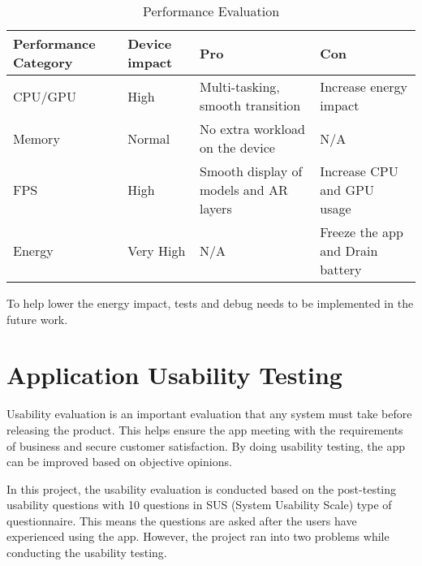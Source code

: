 \begin{table}[!h]
\centering
\begin{tabularx}{\textwidth} {
  | >{\raggedright\arraybackslash}X 
  | >{\raggedright\arraybackslash}X 
  | >{\raggedright\arraybackslash}X 
  | >{\raggedright\arraybackslash}X | }
\hline
Performance Category & Device impact & Pro & Con \\
\hline
\hline
CPU/GPU& High & Multi-tasking, smooth transition & Increase energy impact  \\
\hline
Memory & Normal & No extra workload on the device & N/A \\
\hline
FPS & High & Smooth display of models and AR layers & Increase CPU and GPU usage \\
\hline
Energy & Very High & N/A & Freeze the app and Drain battery \\
\hline
\end{tabularx}
\caption {Performance Evaluation}
\label{tab:perEvaluation}
\end{table}

To help lower the energy impact, tests and debug needs to be implemented in the future work. 

\section{Application Usability Testing}

Usability evaluation is an important evaluation that any system must take before releasing the product. This helps ensure the app meeting with the requirements of business and secure customer satisfaction. By doing usability testing, the app can be improved based on objective opinions. 

In this project, the usability evaluation is conducted based on the post-testing usability questions with 10 questions in SUS (System Usability Scale) type of questionnaire. This means the questions are asked after the users have experienced using the app. 
However, the project ran into two problems while conducting the usability testing. 

